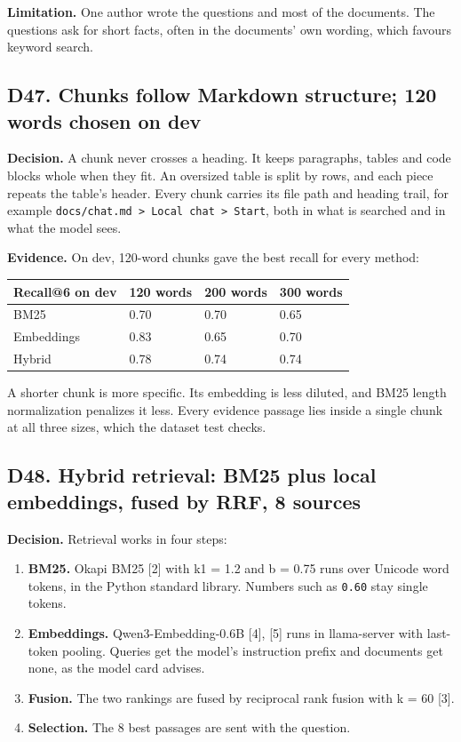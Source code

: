 \documentclass[11pt,a4paper]{article}
\newcommand{\code}[1]{\texttt{#1}}
\begin{document}
\textbf{Limitation.} One author wrote the questions and most of the documents. The questions ask for short facts, often in the documents' own wording, which favours keyword search.

\subsection{D47. Chunks follow Markdown structure; 120 words chosen on dev}

\textbf{Decision.} A chunk never crosses a heading. It keeps paragraphs, tables and code blocks whole when they fit. An oversized table is split by rows, and each piece repeats the table's header. Every chunk carries its file path and heading trail, for example \code{docs/chat.md > Local chat > Start}, both in what is searched and in what the model sees.

\textbf{Evidence.} On dev, 120-word chunks gave the best recall for every method:

\begin{table}[H]\centering\small
\begin{tabularx}{\textwidth}{@{}Ylll@{}}
\toprule
Recall@6 on dev & 120 words & 200 words & 300 words \\
\midrule
BM25 & 0.70 & 0.70 & 0.65 \\
Embeddings & 0.83 & 0.65 & 0.70 \\
Hybrid & 0.78 & 0.74 & 0.74 \\
\bottomrule\end{tabularx}\end{table}

A shorter chunk is more specific. Its embedding is less diluted, and BM25 length normalization penalizes it less. Every evidence passage lies inside a single chunk at all three sizes, which the dataset test checks.

\subsection{D48. Hybrid retrieval: BM25 plus local embeddings, fused by RRF, 8 sources}

\textbf{Decision.} Retrieval works in four steps:

\begin{enumerate}
\item \textbf{BM25.} Okapi BM25 [2] with k1 = 1.2 and b = 0.75 runs over Unicode word tokens, in the Python standard library. Numbers such as \code{0.60} stay single tokens.
\item \textbf{Embeddings.} Qwen3-Embedding-0.6B [4], [5] runs in llama-server with last-token pooling. Queries get the model's instruction prefix and documents get none, as the model card advises.
\item \textbf{Fusion.} The two rankings are fused by reciprocal rank fusion with k = 60 [3].
\item \textbf{Selection.} The 8 best passages are sent with the question.
\end{enumerate}
\end{document}
